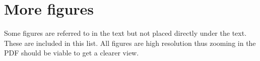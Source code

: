 \chapter*{More figures}
\label{ch:more_figures}

Some figures are referred to in the text but not placed directly under the text. These are included in this list. All figures are high resolution thus zooming in the PDF should be viable to get a clearer view.


%
